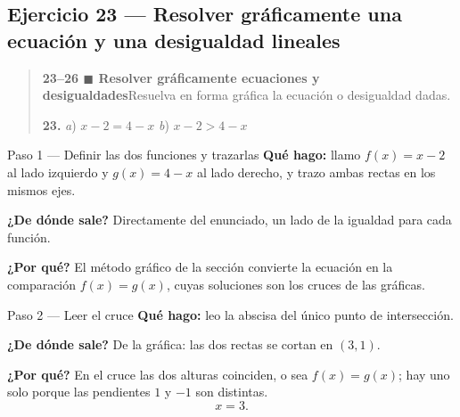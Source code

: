\documentclass[11pt]{article}
\begin{document}
\subsection*{Ejercicio 23 — Resolver gráficamente una ecuación y una desigualdad lineales}

\begin{quote}
\textbf{23--26 $\blacksquare$ Resolver gráficamente ecuaciones y desigualdades}\quad Resuelva en forma gráfica la ecuación o desigualdad dadas.

\textbf{23.} \emph{a}) $x-2=4-x$ \hfill \emph{b}) $x-2>4-x$
\end{quote}

\begin{paso}{Paso 1 --- Definir las dos funciones y trazarlas}
\textbf{Qué hago:} llamo $f(x)=x-2$ al lado izquierdo y $g(x)=4-x$ al lado derecho, y trazo ambas rectas en los mismos ejes.

\textbf{¿De dónde sale?} Directamente del enunciado, un lado de la igualdad para cada función.

\textbf{¿Por qué?} El método gráfico de la sección convierte la ecuación en la comparación $f(x)=g(x)$, cuyas soluciones son los cruces de las gráficas.
\begin{center}
\end{center}
\end{paso}

\begin{paso}{Paso 2 --- Leer el cruce}
\textbf{Qué hago:} leo la abscisa del único punto de intersección.

\textbf{¿De dónde sale?} De la gráfica: las dos rectas se cortan en $(3,1)$.

\textbf{¿Por qué?} En el cruce las dos alturas coinciden, o sea $f(x)=g(x)$; hay uno solo porque las pendientes $1$ y $-1$ son distintas.
\[
x=3.
\]
\end{paso}
\end{document}
